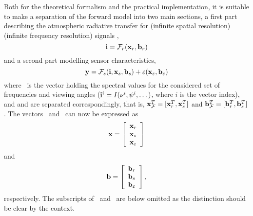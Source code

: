  Both for the theoretical formalism and the practical implementation,
 it is suitable to make a separation of the forward model into two
 main sections, a first part describing the atmospheric radiative
 transfer for  (infinite spatial resolution)
  (infinite frequency resolution) signals
 \citep{eriksson:99},
 \begin{equation}
   \mathbf{i} = \mathcal{F}_r(\mathbf{x}_{r},\mathbf{b}_{r})
  \label{eq:formalism:fma}
 \end{equation}
 and a second part modelling sensor characteristics,
 \begin{equation}
   \mathbf{y} = \mathcal{F}_s(\mathbf{i},\mathbf{x}_{s},\mathbf{b}_{s}) + 
                       \varepsilon(\mathbf{x}_{\varepsilon},\mathbf{b}_{\varepsilon})
  \label{eq:formalism:fms}
 \end{equation}
 where \MpiVct\ is the vector holding the spectral values for the
 considered set of frequencies and viewing angles
 ($\mathbf{i}^i=I(\nu^i,\psi^i,\dots)$, where $i$ is the vector
 index), and \aSttVct{\FrwMdl} and \aFrwMdlVct{\FrwMdl} are separated
 correspondingly, that is, $\mathbf{x}_{\mathcal{F}}^T=
 [\mathbf{x}_{r}^T,\mathbf{x}_{s}^T]$ and $\mathbf{b}_{\mathcal{F}}^T=
 [\mathbf{b}_{r}^T,\mathbf{b}_{s}^T]$.  The vectors \SttVct\ and
 \FrwMdlVct\ can now be expressed as
 \begin{equation}
   \mathbf{x} = \left[ \begin{array}{c} \mathbf{x}_{r} \\ \mathbf{x}_{s} \\ 
                                       \mathbf{x}_{\varepsilon} \end{array} \right]
 \end{equation}
 and
 \begin{equation}
   \mathbf{b} = \left[ \begin{array}{c} \mathbf{b}_{r}\\ \mathbf{b}_{s} \\ 
                                    \mathbf{b}_{\varepsilon} \end{array}\right],
 \end{equation}
 respectively. The subscripts of \SttVct\ and \FrwMdlVct\ are below
 omitted as the distinction should be clear by the context.



 \label{sec:formalism:sensor}
  
